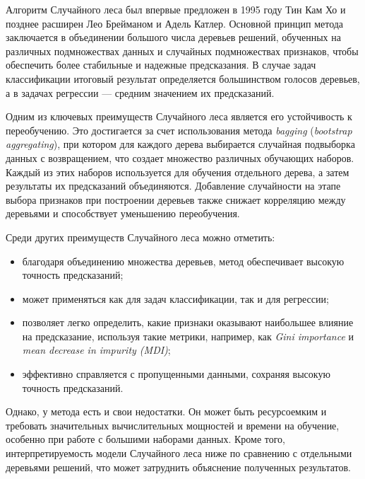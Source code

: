 Алгоритм Случайного леса был впервые предложен в 1995 году Тин Кам Хо и позднее расширен Лео Брейманом и Адель Катлер. Основной принцип метода заключается в объединении большого числа деревьев решений, обученных на различных подмножествах данных и случайных подмножествах признаков, чтобы обеспечить более стабильные и надежные предсказания. В случае задач классификации итоговый результат определяется большинством голосов деревьев, а в задачах регрессии — средним значением их предсказаний.

Одним из ключевых преимуществ Случайного леса является его устойчивость к переобучению. Это достигается за счет использования метода \textit{bagging} (\textit{bootstrap aggregating}), при котором для каждого дерева выбирается случайная подвыборка данных с возвращением, что создает множество различных обучающих наборов. Каждый из этих наборов используется для обучения отдельного дерева, а затем результаты их предсказаний объединяются. Добавление случайности на этапе выбора признаков при построении деревьев также снижает корреляцию между деревьями и способствует уменьшению переобучения.

Среди других преимуществ Случайного леса можно отметить:
\begin{itemize}
    \item благодаря объединению множества деревьев, метод обеспечивает высокую точность предсказаний;
    \item может применяться как для задач классификации, так и для регрессии;
    \item позволяет легко определить, какие признаки оказывают наибольшее влияние на предсказание, используя такие метрики, например, как \textit{Gini importance} и \textit{mean decrease in impurity (MDI)};
    \item  эффективно справляется с пропущенными данными, сохраняя высокую точность предсказаний.
\end{itemize}

Однако, у метода есть и свои недостатки. Он может быть ресурсоемким и требовать значительных вычислительных мощностей и времени на обучение, особенно при работе с большими наборами данных. Кроме того, интерпретируемость модели Случайного леса ниже по сравнению с отдельными деревьями решений, что может затруднить объяснение полученных результатов.

